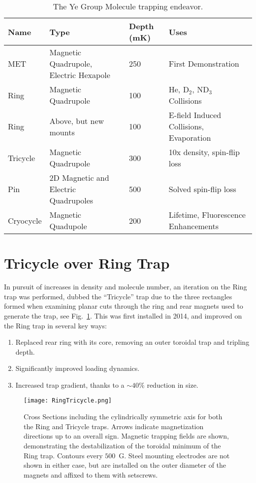 \renewcommand{\arraystretch}{1.5}
\begin{table}[t!]
\centering
\caption{
The Ye Group Molecule trapping endeavor.\label{trappingtable}
}
\label{tab:rates}
\begin{tabular}{ L{2.5cm} | C{4.5cm} C{2.5cm} C{4.5cm} }
Name & Type & Depth (mK) & Uses \\
\hline\hline
MET 	& Magnetic Quadrupole, Electric Hexapole & 250 	& First Demonstration~\cite{Sawyer2007} 	 \\
\hline
Ring 		& Magnetic Quadrupole				& 100 	& He, D$_2$, ND$_3$ Collisions~\cite{Sawyer2008,Sawyer2011} \\
\hline
Ring 		& Above, but new mounts				& 100 	& E-field Induced Collisions,  Evaporation~\cite{Stuhl2012uwave,Stuhl2012evap,Stuhl2013} \\
\hline
Tricycle 	& Magnetic Quadrupole 				& 300 	& 10x density, spin-flip loss \\
\hline
Pin  		& 2D Magnetic and Electric Quadrupoles 	& 500 	& Solved spin-flip loss~\cite{Reens2017}\\
\hline
Cryocycle 	& Magnetic Quadupole 				& 200 	& Lifetime, Fluorescence Enhancements\\
\end{tabular}
\end{table}


\section{Tricycle over Ring Trap}

In pursuit of increases in density and molecule number, an iteration on the Ring trap was performed, dubbed the ``Tricycle'' trap due to the three rectangles formed when examining planar cuts through the ring and rear magnets used to generate the trap, see Fig.~\ref{ringtricyclefigure}.
This was first installed in 2014, and improved on the Ring trap in several key ways:
\begin{enumerate}
\item Replaced rear ring with its core, removing an outer toroidal trap and tripling depth.
\item Significantly improved loading dynamics.
\item Increased trap gradient, thanks to a $\sim 40\%$ reduction in size.
\end{enumerate}

\begin{figure}[t!]
\texttt{[image: RingTricycle.png]}
\caption[Ring and Tricycle Trap Comparison]{\label{ringtricyclefigure}
Cross Sections including the cylindrically symmetric axis for both the Ring and Tricycle traps. Arrows indicate magnetization directions up to an overall sign. Magnetic trapping fields are shown, demonstrating the destabilization of the toroidal minimum of the Ring trap. Contours every $500$~G. Steel mounting electrodes are not shown in either case, but are installed on the outer diameter of the magnets and affixed to them with setscrews.
}
\end{figure}

